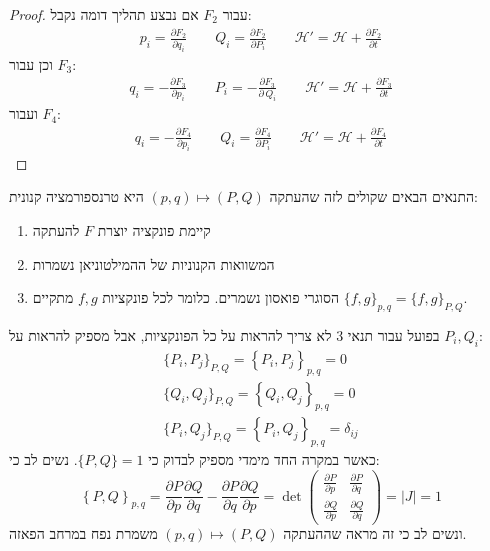 \documentclass{tstextbook}
\begin{document}
\begin{proof}
עבור \(F_{2}\) אם נבצע תהליך דומה נקבל:
$$\begin{array}{c}{{p_{i}=\displaystyle\frac{\partial F_{2}}{\partial q_{i}}}}\qquad  {{Q_{i}=\displaystyle\frac{\partial F_{2}}{\partial P_{i}}}}\qquad  {{\mathcal{H}'=\mathcal{H}+\displaystyle\frac{\partial F_{2}}{\partial t}}}\end{array}$$
וכן עבור \(F_{3}\):
$$\begin{array}{c}{{q_{i}=-{\displaystyle\frac{\partial F_{3}}{\partial p_{i}}}}}\qquad  {{P_{i}=-{\displaystyle\frac{\partial F_{3}}{\partial\,Q_{i}}}}}\qquad  {{\mathcal{H}'=\mathcal{H}+{\displaystyle\frac{\partial F_{3}}{\partial t}}}}\end{array}$$
ועבור \(F_{4}\):
$$\begin{array}{c}{{q_{i}=-{\displaystyle\frac{\partial F_{4}}{\partial p_{i}}}}}\qquad  {{Q_{i}={\displaystyle\frac{\partial F_{4}}{\partial P_{i}}}}}\qquad  {{\mathcal{H}'=\mathcal{H}+{\displaystyle\frac{\partial F_{4}}{\partial t}}}}\end{array}$$

\end{proof}
\begin{proposition}
התנאים הבאים שקולים לזה שהעתקה \((p,q)\mapsto(P,Q)\) היא טרנספורמציה קנונית:

  \begin{enumerate}
    \item קיימת פונקציה יוצרת \(F\) להעתקה 


    \item המשוואות הקנוניות של ההמילטוניאן נשמרות 


    \item הסוגרי פואסון נשמרים. כלומר לכל פונקציות \(f,g\) מתקיים \(\{ f,g \}_{p,q}=\{ f,g \}_{P,Q}\). 


  \end{enumerate}
\end{proposition}
בפועל עבור תנאי 3 לא צריך להראות על כל הפונקציות, אבל מספיק להראות על \(P_{i},Q_{i}\):
$$\begin{array}{l}{{\{P_{i},P_{j}\}_{P,Q}=\left\{P_{i},P_{j}\right\}_{p,q}=0}}\\ {{\{Q_{i},Q_{j}\}_{P,Q}=\left\{Q_{i},Q_{j}\right\}_{p,q}=0}}\\ {{\{P_{i},Q_{j}\}_{P,Q}=\left\{P_{i},Q_{j}\right\}_{p,q}=\delta_{i j}}}\end{array}$$
כאשר במקרה החד מימדי מספיק לבדוק כי \(\{ P,Q \}=1\). נשים לב כי:
$$\left\{{ P},{ Q}\right\}_{p,q}=\frac{\partial{ P}}{\partial p}\frac{\partial{Q}}{\partial q}-\frac{\partial{ P}}{\partial q}\frac{\partial{ Q}}{\partial p}=\operatorname*{det}\begin{pmatrix}\frac{\partial P}{\partial p} & \frac{\partial P}{\partial q} \\\frac{\partial Q}{\partial p} & \frac{\partial Q}{\partial q}
\end{pmatrix}=|{J}|=1$$
ונשים לב כי זה מראה שההעתקה \((p,q)\mapsto(P,Q)\) משמרת נפח במרחב הפאזה.
\end{document}
